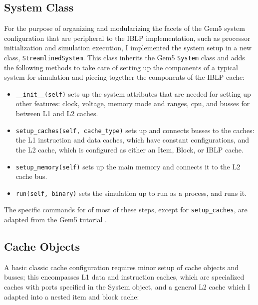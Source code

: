 \documentclass[12pt,twoside]{reedthesis}
\begin{document}
	\subsection*{System Class}

	For the purpose of organizing and modularizing the facets of the Gem5 system configuration that are peripheral to the IBLP implementation, such as processor initialization and simulation execution, I implemented the system setup in a new class, \verb`StreamlinedSystem`. This class inherits the Gem5 \verb`System` class and adds the following methods to take care of setting up the components of a typical system for simulation and piecing together the components of the IBLP cache:

	\begin{itemize}
		\item \verb`__init__(self)` sets up the system attributes that are needed for setting up other features: clock, voltage, memory mode and ranges, cpu, and busses for between L1 and L2 caches.
	
		\item \verb`setup_caches(self, cache_type)` sets up and connects busses to the caches: the L1 instruction and data caches, which have constant configurations, and the L2 cache, which is configured as either an Item, Block, or IBLP cache.
	
		\item \verb`setup_memory(self)` sets up the main memory and connects it to the L2 cache bus.
	
		\item \verb`run(self, binary)` sets the simulation up to run as a process, and runs it.
	\end{itemize}

	The specific commands for of most of these steps, except for \verb`setup_caches`, are adapted from the Gem5 tutorial \cite{gem5-tutorial}.

	\subsection*{Cache Objects}

	A basic classic cache configuration requires minor setup of cache objects and busses; this encompasses L1 data and instruction caches, which are specialized caches with ports specified in the System object, and a general L2 cache which I adapted into a nested item and block cache:
\end{document}
